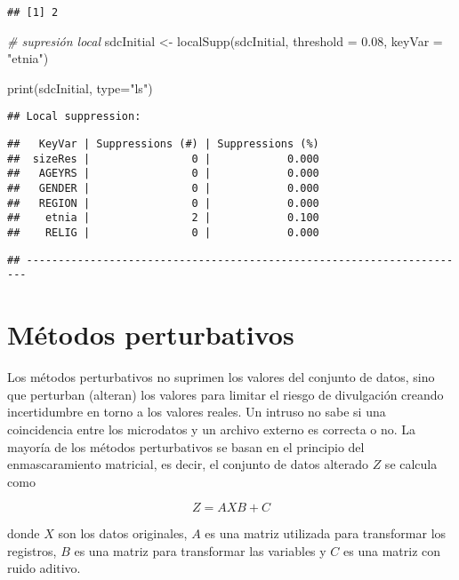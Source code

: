 \documentclass[
]{book}
\newenvironment{Shaded}{\begin{snugshade}}{\end{snugshade}}
\newcommand{\AttributeTok}[1]{\textcolor[rgb]{0.77,0.63,0.00}{#1}}
\newcommand{\CommentTok}[1]{\textcolor[rgb]{0.56,0.35,0.01}{\textit{#1}}}
\newcommand{\FloatTok}[1]{\textcolor[rgb]{0.00,0.00,0.81}{#1}}
\newcommand{\FunctionTok}[1]{\textcolor[rgb]{0.00,0.00,0.00}{#1}}
\newcommand{\NormalTok}[1]{#1}
\newcommand{\OtherTok}[1]{\textcolor[rgb]{0.56,0.35,0.01}{#1}}
\newcommand{\StringTok}[1]{\textcolor[rgb]{0.31,0.60,0.02}{#1}}
\theoremstyle{definition}
\theoremstyle{definition}
\theoremstyle{definition}
\theoremstyle{definition}
\theoremstyle{remark}
\begin{document}
\begin{verbatim}
## [1] 2
\end{verbatim}

\begin{Shaded}
\begin{Highlighting}[]
\CommentTok{\# supresión local}
\NormalTok{sdcInitial }\OtherTok{\textless{}{-}} \FunctionTok{localSupp}\NormalTok{(sdcInitial, }\AttributeTok{threshold =} \FloatTok{0.08}\NormalTok{, }\AttributeTok{keyVar =} \StringTok{"etnia"}\NormalTok{)}

\FunctionTok{print}\NormalTok{(sdcInitial, }\AttributeTok{type=}\StringTok{"ls"}\NormalTok{)}
\end{Highlighting}
\end{Shaded}

\begin{verbatim}
## Local suppression:
\end{verbatim}

\begin{verbatim}
##   KeyVar | Suppressions (#) | Suppressions (%)
##  sizeRes |                0 |            0.000
##   AGEYRS |                0 |            0.000
##   GENDER |                0 |            0.000
##   REGION |                0 |            0.000
##    etnia |                2 |            0.100
##    RELIG |                0 |            0.000
\end{verbatim}

\begin{verbatim}
## ----------------------------------------------------------------------
\end{verbatim}

\hypertarget{muxe9todos-perturbativos}{%
\section{Métodos perturbativos}\label{muxe9todos-perturbativos}}

Los métodos perturbativos no suprimen los valores del conjunto de datos, sino que perturban (alteran) los valores para limitar el riesgo de divulgación creando incertidumbre en torno a los valores reales. Un intruso no sabe si una coincidencia entre los microdatos y un archivo externo es correcta o no. La mayoría de los métodos perturbativos se basan en el principio del enmascaramiento matricial, es decir, el conjunto de datos alterado \(Z\) se calcula como

\[Z = AXB + C\]

donde \(X\) son los datos originales, \(A\) es una matriz utilizada para transformar los registros, \(B\) es una matriz para transformar las variables y \(C\) es una matriz con ruido aditivo.
\end{document}

